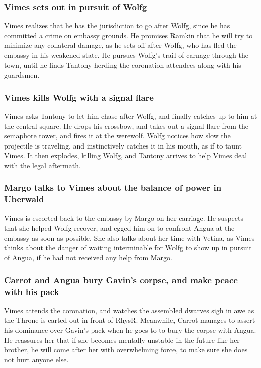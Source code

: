 \subsubsection{\Gls{Vimes} sets out in pursuit of \Gls{Wolfg}}
\Gls{Vimes} realizes that he has the jurisdiction to go after \Gls{Wolfg}, since he has committed
a crime on embassy grounds. He promises \Gls{Ramkin} that he will try to minimize any collateral
damage, as he sets off after \Gls{Wolfg}, who has fled the embassy in his weakened state. He
pursues \Gls{Wolfg}'s trail of carnage through the town, until he finds \Gls{Tantony} herding the
coronation attendees along with his guardsmen.

\subsubsection{\Gls{Vimes} kills \Gls{Wolfg} with a signal flare}
\Gls{Vimes} asks \Gls{Tantony} to let him chase after \Gls{Wolfg}, and finally catches up to him
at the central square. He drops his crossbow, and takes out a signal flare from the semaphore tower,
and fires it at the werewolf. \Gls{Wolfg} notices how slow the projectile is traveling, and
instinctively catches it in his mouth, as if to taunt \Gls{Vimes}. It then explodes, killing
\Gls{Wolfg}, and \Gls{Tantony} arrives to help \Gls{Vimes} deal with the legal aftermath.

\subsubsection{\Gls{Margo} talks to \Gls{Vimes} about the balance of power in Uberwald}
\Gls{Vimes} is escorted back to the embassy by \Gls{Margo} on her carriage. He suspects that she
helped \Gls{Wolfg} recover, and egged him on to confront \Gls{Angua} at the embassy as soon as
possible. She also talks about her time with \Gls{Vetina}, as \Gls{Vimes} thinks about the danger
of waiting interminable for \Gls{Wolfg} to show up in pursuit of \Gls{Angua}, if he had not received
any help from \Gls{Margo}.

\subsubsection{\Gls{Carrot} and \Gls{Angua} bury \Gls{Gavin}'s corpse, and make peace with his pack}
\Gls{Vimes} attends the coronation, and watches the assembled dwarves sigh in awe as the Throne is
carted out in front of \Gls{RhysR}. Meanwhile, \Gls{Carrot} manages to assert his dominance over
\Gls{Gavin}'s pack when he goes to to bury the corpse with \Gls{Angua}. He reassures her that if
she becomes mentally unstable in the future like her brother, he will come after her with
overwhelming force, to make sure she does not hurt anyone else.

